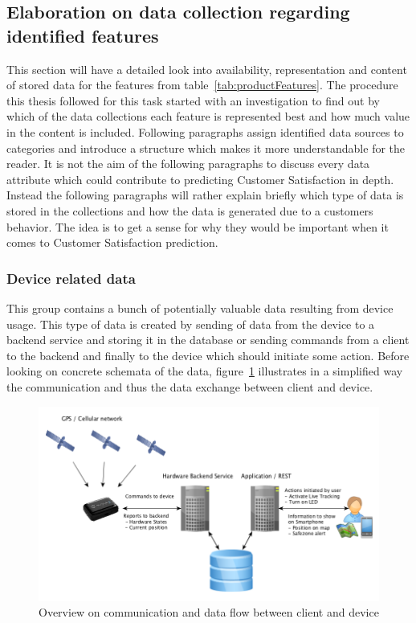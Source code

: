 \subsection{Elaboration on data collection regarding identified features}
This section will have a detailed look into availability, representation and content of stored data for the features from table~\ref{tab:productFeatures}. The procedure this thesis followed for this task started with an investigation to find out by which of the data collections each feature is represented best and how much value in the content is included. Following paragraphs assign identified data sources to categories and introduce a structure which makes it more understandable for the reader. It is not the aim of the following paragraphs to discuss every data attribute which could contribute to predicting Customer Satisfaction in depth. Instead the following paragraphs will rather explain briefly which type of data is stored in the collections and how the data is generated due to a customers behavior. The idea is to get a sense for why they would be important when it comes to Customer Satisfaction prediction.

\subsubsection{Device related data}
\label{sssec:deviceRelatedData}
This group contains a bunch of potentially valuable data resulting from device usage. This type of data is created by sending of data from the device to a backend service and storing it in the database or sending commands from a client to the backend and finally to the device which should initiate some action. Before looking on concrete schemata of the data, figure~\ref{fig:tractiveDataFlow} illustrates in a simplified way the communication and thus the data exchange between client and device. 

\begin{figure}
	\centering
		\includegraphics[width=1.0\textwidth]{img/tractiveDataFlow.png}
	\caption{Overview on communication and data flow between client and device}
	\label{fig:tractiveDataFlow}
\end{figure}

